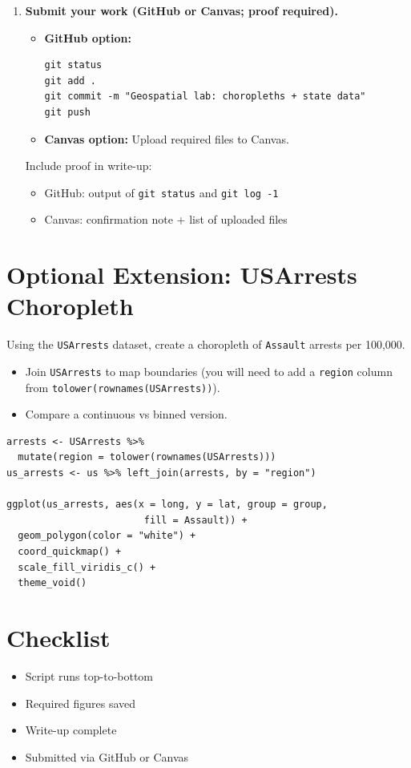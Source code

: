 \documentclass[11pt]{article}
\begin{document}
\begin{enumerate}
\item \textbf{Submit your work (GitHub or Canvas; proof required).}

\begin{itemize}
  \item \textbf{GitHub option:}
\begin{verbatim}
git status
git add .
git commit -m "Geospatial lab: choropleths + state data"
git push
\end{verbatim}

  \item \textbf{Canvas option:}
  Upload required files to Canvas.
\end{itemize}

Include proof in write-up:
\begin{itemize}
  \item GitHub: output of \texttt{git status} and \texttt{git log -1}
  \item Canvas: confirmation note + list of uploaded files
\end{itemize}

\end{enumerate}

\section*{Optional Extension: USArrests Choropleth}

Using the \texttt{USArrests} dataset, create a choropleth of \texttt{Assault} arrests per 100,000.
\begin{itemize}
  \item Join \texttt{USArrests} to map boundaries (you will need to add a \texttt{region} column from \texttt{tolower(rownames(USArrests))}).
  \item Compare a continuous vs binned version.
\end{itemize}

\begin{verbatim}
arrests <- USArrests %>%
  mutate(region = tolower(rownames(USArrests)))
us_arrests <- us %>% left_join(arrests, by = "region")

ggplot(us_arrests, aes(x = long, y = lat, group = group,
                        fill = Assault)) +
  geom_polygon(color = "white") +
  coord_quickmap() +
  scale_fill_viridis_c() +
  theme_void()
\end{verbatim}

\section*{Checklist}
\begin{itemize}
  \item Script runs top-to-bottom
  \item Required figures saved
  \item Write-up complete
  \item Submitted via GitHub or Canvas
\end{itemize}
\end{document}
